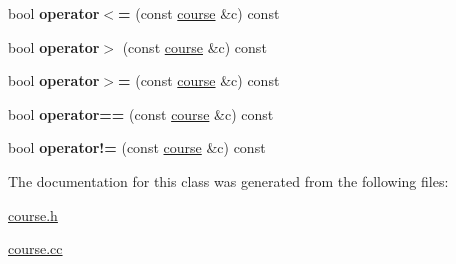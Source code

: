\begin{DoxyCompactItemize}
\item 
bool {\bfseries operator$<$=} (const \hyperlink{classcourse}{course} \&c) const \hypertarget{classcourse_a6416d3083ef57cca7ed77f260f48dc11}{}\label{classcourse_a6416d3083ef57cca7ed77f260f48dc11}

\item 
bool {\bfseries operator$>$} (const \hyperlink{classcourse}{course} \&c) const \hypertarget{classcourse_a3d4e2681ba4f3ada21b2375129dbdae6}{}\label{classcourse_a3d4e2681ba4f3ada21b2375129dbdae6}

\item 
bool {\bfseries operator$>$=} (const \hyperlink{classcourse}{course} \&c) const \hypertarget{classcourse_a3ca9c58c57cb82c195656648ee0dacab}{}\label{classcourse_a3ca9c58c57cb82c195656648ee0dacab}

\item 
bool {\bfseries operator==} (const \hyperlink{classcourse}{course} \&c) const \hypertarget{classcourse_a9902543488788e4d53cd4614ed52ad25}{}\label{classcourse_a9902543488788e4d53cd4614ed52ad25}

\item 
bool {\bfseries operator!=} (const \hyperlink{classcourse}{course} \&c) const \hypertarget{classcourse_a7e598f9d46bd8ac668c2f3429f065446}{}\label{classcourse_a7e598f9d46bd8ac668c2f3429f065446}

\end{DoxyCompactItemize}


The documentation for this class was generated from the following files\+:\begin{DoxyCompactItemize}
\item 
\hyperlink{course_8h}{course.\+h}\item 
\hyperlink{course_8cc}{course.\+cc}\end{DoxyCompactItemize}
